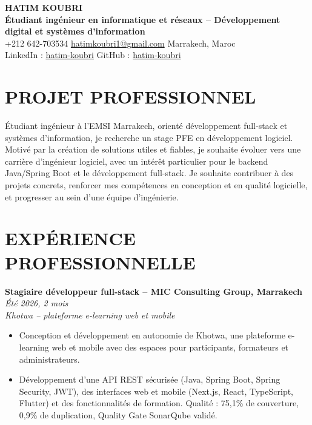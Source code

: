\documentclass[a4paper,11pt]{article}
\begin{document}
\fontsize{11}{12.6}\selectfont

\begin{center}
  {\LARGE\bfseries HATIM KOUBRI}\\[-0.1em]
  {\normalsize\bfseries Étudiant ingénieur en informatique et réseaux -- Développement digital et systèmes d'information}\\[0.1em]
  +212 642-703534 \textbar{} \href{mailto:hatimkoubri1@gmail.com}{hatimkoubri1@gmail.com} \textbar{} Marrakech, Maroc\\[-0.1em]
  LinkedIn : \href{https://linkedin.com/in/hatim-koubri}{hatim-koubri} \textbar{} GitHub : \href{https://github.com/hatim-koubri}{hatim-koubri}
\end{center}
\vspace{-0.25em}

\section{PROJET PROFESSIONNEL}
Étudiant ingénieur à l'EMSI Marrakech, orienté développement full-stack et systèmes d'information, je recherche un stage PFE en développement logiciel. Motivé par la création de solutions utiles et fiables, je souhaite évoluer vers une carrière d'ingénieur logiciel, avec un intérêt particulier pour le backend Java/Spring Boot et le développement full-stack. Je souhaite contribuer à des projets concrets, renforcer mes compétences en conception et en qualité logicielle, et progresser au sein d'une équipe d'ingénierie.

\section{EXPÉRIENCE PROFESSIONNELLE}
\textbf{Stagiaire développeur full-stack -- MIC Consulting Group, Marrakech} \hfill \textit{Été 2026, 2 mois}\\[-0.05em]
\emph{Khotwa -- plateforme e-learning web et mobile}
\begin{itemize}
  \item Conception et développement en autonomie de Khotwa, une plateforme e-learning web et mobile avec des espaces pour participants, formateurs et administrateurs.
  \item Développement d'une API REST sécurisée (Java, Spring Boot, Spring Security, JWT), des interfaces web et mobile (Next.js, React, TypeScript, Flutter) et des fonctionnalités de formation. Qualité : 75,1\% de couverture, 0,9\% de duplication, Quality Gate SonarQube validé.
\end{itemize}
\end{document}
